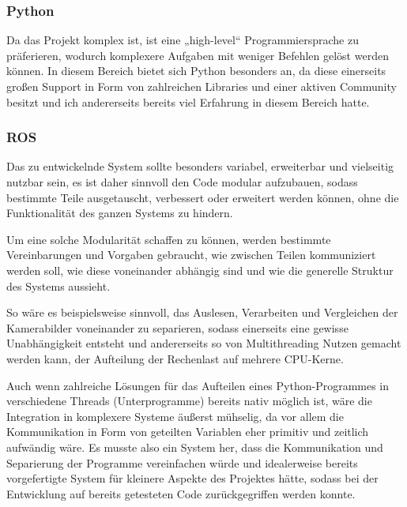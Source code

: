 \documentclass[12pt, ngerman]{article}
\begin{document}
\subsubsection{Python}
Da das Projekt komplex ist, ist eine „high-level“ Programmiersprache zu präferieren, wodurch komplexere Aufgaben mit weniger Befehlen gelöst werden können. In diesem Bereich bietet sich Python besonders an, da diese einerseits großen Support in Form von zahlreichen Libraries und einer aktiven Community besitzt und ich andererseits bereits viel Erfahrung in diesem Bereich hatte. 

\subsubsection{ROS}
Das zu entwickelnde System sollte besonders variabel, erweiterbar und vielseitig nutzbar sein, es ist daher sinnvoll den Code modular aufzubauen, sodass bestimmte Teile ausgetauscht, verbessert oder erweitert werden können, ohne die Funktionalität des ganzen Systems zu hindern.  

Um eine solche Modularität schaffen zu können, werden bestimmte Vereinbarungen und Vorgaben gebraucht, wie zwischen Teilen kommuniziert werden soll, wie diese voneinander abhängig sind und wie die generelle Struktur des Systems aussieht.  

So wäre es beispielsweise sinnvoll, das Auslesen, Verarbeiten und Vergleichen der Kamerabilder voneinander zu separieren, sodass einerseits eine gewisse Unabhängigkeit entsteht und andererseits so von Multithreading Nutzen gemacht werden kann, der Aufteilung der Rechenlast auf mehrere CPU-Kerne.  

Auch wenn zahlreiche Lösungen für das Aufteilen eines Python-Programmes in verschiedene Threads (Unterprogramme) bereits nativ möglich ist, wäre die Integration in komplexere Systeme äußerst mühselig, da vor allem die Kommunikation in Form von geteilten Variablen eher primitiv und zeitlich aufwändig wäre. Es musste also ein System her, dass die Kommunikation und Separierung der Programme vereinfachen würde und idealerweise bereits vorgefertigte System für kleinere Aspekte des Projektes hätte, sodass bei der Entwicklung auf bereits getesteten Code zurückgegriffen werden konnte. 
\end{document}
